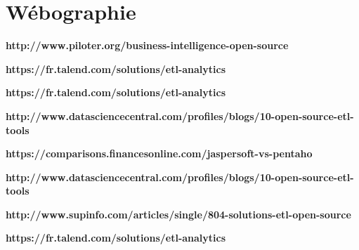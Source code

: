 \documentclass[12pt,a4wide,twoside]{report}
\begin{document}
\chapter*{Wébographie}
\begin{description}
	\item \textbf{http://www.piloter.org/business-intelligence-open-source}
	\item \textbf{https://fr.talend.com/solutions/etl-analytics}
		\item \textbf{https://fr.talend.com/solutions/etl-analytics}
			\item \textbf{http://www.datasciencecentral.com/profiles/blogs/10-open-source-etl-tools}
			\item \textbf{https://comparisons.financesonline.com/jaspersoft-vs-pentaho}
			\item \textbf{http://www.datasciencecentral.com/profiles/blogs/10-open-source-etl-tools}
			\item \textbf{http://www.supinfo.com/articles/single/804-solutions-etl-open-source}
			\item \textbf{https://fr.talend.com/solutions/etl-analytics}



\end{description}


					
					
					
					

\end{document}
